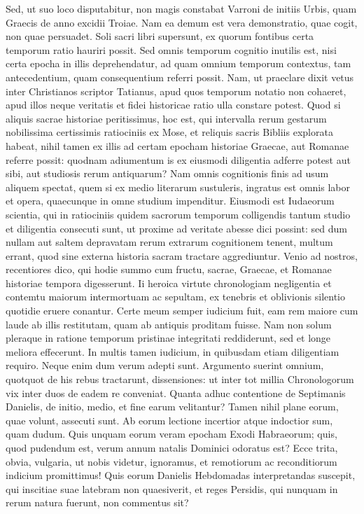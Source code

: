 Sed, ut suo loco disputabitur,
non magis constabat Varroni de initiis Urbis, quam Graecis de
anno excidii Troiae.
Nam ea demum est vera demonstratio, quae cogit,
non quae persuadet.
Soli sacri libri supersunt, ex quorum fontibus
certa temporum ratio hauriri possit.
Sed omnis temporum cognitio
inutilis est, nisi certa epocha in illis deprehendatur, ad quam omnium
temporum contextus, tam antecedentium, quam consequentium referri
possit.
Nam, ut praeclare dixit vetus inter Christianos scriptor
Tatianus, apud quos temporum notatio non cohaeret, apud illos neque
veritatis et fidei historicae ratio ulla constare potest.
Quod si aliquis
sacrae historiae peritissimus, hoc est, qui intervalla rerum gestarum
nobilissima certissimis ratiociniis ex Mose, et
 reliquis sacris Bibliis explorata
habeat, nihil tamen ex illis ad certam epocham historiae Graecae,
aut Romanae referre possit: quodnam adiumentum is ex eiusmodi
diligentia adferre potest aut sibi, aut studiosis rerum antiquarum?
Nam omnis cognitionis finis ad usum aliquem spectat, quem si ex medio
literarum sustuleris, ingratus est omnis labor et opera, quaecunque
in omne studium impenditur.
Eiusmodi est Iudaeorum scientia, qui
in ratiociniis quidem sacrorum temporum colligendis tantum studio
et diligentia consecuti sunt, ut proxime ad veritate abesse dici possint: sed
dum nullam aut saltem depravatam rerum extrarum cognitionem
tenent, multum errant, quod sine externa historia sacram tractare
aggrediuntur.
Venio ad nostros, recentiores dico, qui hodie summo
cum fructu, sacrae, Graecae, et Romanae historiae tempora digesserunt.
Ii heroica virtute chronologiam negligentia et contemtu maiorum
intermortuam ac sepultam, ex tenebris et oblivionis silentio quotidie
eruere conantur.
Certe meum semper iudicium fuit, eam rem maiore
cum laude ab illis restitutam, quam ab antiquis proditam fuisse.
Nam
non solum pleraque in ratione temporum pristinae integritati reddiderunt,
sed et longe meliora effecerunt.
In multis tamen iudicium, in quibusdam
etiam diligentiam requiro.
Neque enim dum verum adepti sunt.
Argumento suerint omnium, quotquot de his rebus tractarunt,
 dissensiones:
ut inter tot millia Chronologorum vix inter duos de eadem re
conveniat.
Quanta adhuc contentione de Septimanis Danielis, de initio,
medio, et fine earum velitantur?
Tamen nihil plane eorum, quae volunt,
assecuti sunt.
Ab eorum lectione incertior atque indoctior sum,
quam dudum.
Quis unquam eorum veram epocham Exodi Habraeorum;
quis, quod pudendum est, verum annum natalis Dominici odoratus
est?
Ecce trita, obvia, vulgaria, ut nobis videtur, ignoramus, et remotiorum
ac reconditiorum indicium promittimus!
Quis eorum Danielis
Hebdomadas interpretandas suscepit, qui inscitiae suae latebram
non quaesiverit, et reges Persidis, qui nunquam in rerum natura fuerunt,
non commentus sit?

